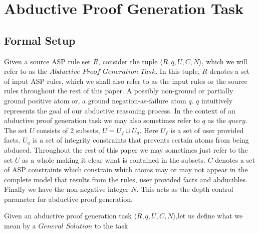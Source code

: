 \section{Abductive Proof Generation Task}\label{sec:abductive_proof}

\subsection{Formal Setup}\label{formalsetup}


\begin{definition}\label{def:abductive_proof_generation_task}

Given a source ASP rule set $R$, consider the tuple $\langle R,q,U,C,N \rangle$, which we will refer to as the $\textit{Abductive Proof Generation Task}$. In this tuple,  $R$ denotes a set of input ASP rules, which we shall also refer to as the input rules or the source rules throughout the rest of this paper. A possibly non-ground or partially ground positive atom or, a ground negation-as-failure atom $q$. $q$ intuitively represents the goal of our abductive reasoning process. In the context of an abductive proof generation task we may also sometimes refer to $q$ as the $query$.  The set $U$ consists of 2 subsets, $U = U_{f} \cup U_{a}$. Here $U_{f}$ is a set of user provided facts. $U_{a}$ is a set of integrity constraints that prevents certain atoms from being abduced. Throughout the rest of this paper we may sometimes just refer to the set $U$ as a whole making it clear what is contained in the subsets. $C$ denotes a set of ASP constraints which constrain which atoms may or may not appear in the complete model that results from the rules, user provided facts and abducibles. Finally we have the non-negative integer $N$. This acts as the depth control parameter for abductive proof generation. 
 \end{definition}
Given an abductive proof generation task $\langle R,q,U,C,N \rangle$,let us define what we mean by a $\textit{General Solution}$ to the task
